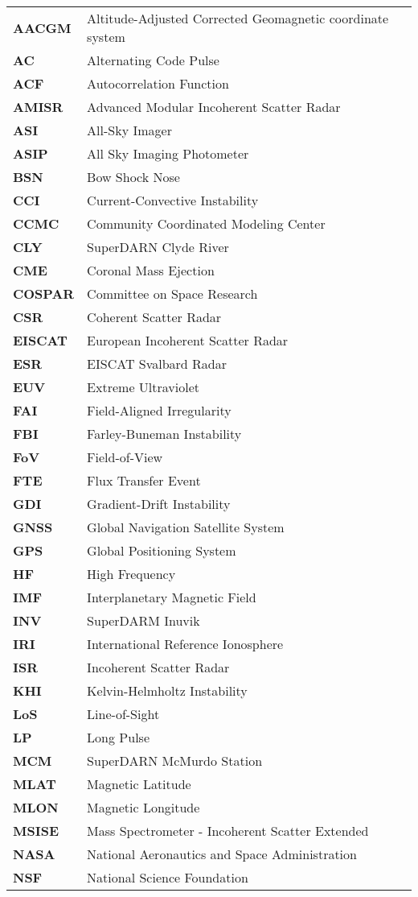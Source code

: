 
\begin{longtable}{ll}
\textbf{AACGM} & Altitude-Adjusted Corrected Geomagnetic coordinate system \\
\textbf{AC} & Alternating Code Pulse \\
\textbf{ACF} & Autocorrelation Function \\
\textbf{AMISR} & Advanced Modular Incoherent Scatter Radar \\
\textbf{ASI} & All-Sky Imager \\
\textbf{ASIP} & All Sky Imaging Photometer \\
\textbf{BSN} & Bow Shock Nose \\
\textbf{CCI} & Current-Convective Instability \\
\textbf{CCMC} & Community Coordinated Modeling Center \\
\textbf{CLY} & SuperDARN Clyde River \\
\textbf{CME} & Coronal Mass Ejection \\
\textbf{COSPAR} & Committee on Space Research \\
\textbf{CSR} & Coherent Scatter Radar \\
\textbf{EISCAT} & European Incoherent Scatter Radar \\
\textbf{ESR} & EISCAT Svalbard Radar \\
\textbf{EUV} & Extreme Ultraviolet \\
\textbf{FAI} & Field-Aligned Irregularity \\
\textbf{FBI} & Farley-Buneman Instability \\
\textbf{FoV} & Field-of-View \\
\textbf{FTE} & Flux Transfer Event \\
\textbf{GDI} & Gradient-Drift Instability \\
\textbf{GNSS} & Global Navigation Satellite System \\
\textbf{GPS} & Global Positioning System \\
\textbf{HF} & High Frequency \\
\textbf{IMF} & Interplanetary Magnetic Field \\
\textbf{INV} & SuperDARM Inuvik \\
\textbf{IRI} & International Reference Ionosphere \\
\textbf{ISR} & Incoherent Scatter Radar \\
\textbf{KHI} & Kelvin-Helmholtz Instability \\
\textbf{LoS} & Line-of-Sight \\
\textbf{LP} & Long Pulse \\
\textbf{MCM} & SuperDARN McMurdo Station \\
\textbf{MLAT} & Magnetic Latitude \\
\textbf{MLON} & Magnetic Longitude \\
\textbf{MSISE} & Mass Spectrometer - Incoherent Scatter Extended \\
\textbf{NASA} & National Aeronautics and Space Administration\\
\textbf{NSF} & National Science Foundation \\


\end{longtable}
